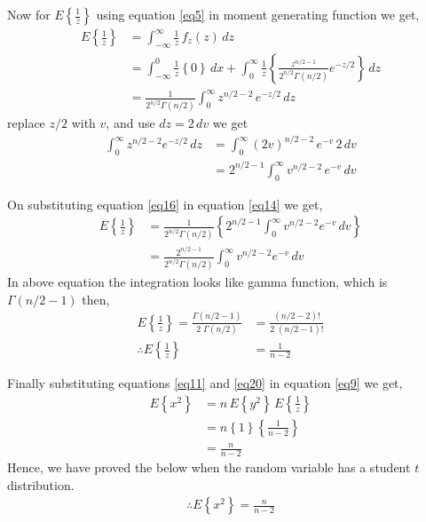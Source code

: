 \documentclass{beamer}
\providecommand{\cbrak}[1]{\ensuremath{\left\{#1\right\}}}
\begin{document}
\begin{frame}
   Now for $E\cbrak{\frac{1}{z}}$ using  equation \eqref{eq5} in moment generating function we get,
   \begin{align}
      E\cbrak{\frac{1}{z}} &= \int_{-\infty}^{\infty} \frac{1}{z} \, f_z(z) \, dz \\
      					  &= \int_{-\infty}^{0} \frac{1}{z} \cbrak{0} \, dx + \int_{0}^{\infty} \frac{1}{z} \cbrak{\frac{z^{n/2 -1}}{2^{n/2} \Gamma(n/2)}e^{- z/2}} \, dz \\
      					  &= \frac{1}{2^{n/2} \Gamma(n/2)}\int_{0}^{\infty} z^{n/2 -2} \, e^{- z/2} \, dz \label{eq14}				  
   \end{align}
   replace $z/2$ with $v$, and use $dz = 2 \, dv$ we get
   \begin{align}
      \int_{0}^{\infty} z^{n/2 -2} e^{- z/2} \, dz 
         &= \int_{0}^{\infty} {(2v)}^{n/2 -2} \, e^{- v} \,  2 \, dv \\
         &= 2^{n/2 - 1} \int_{0}^{\infty} v^{n/2 -2} \, e^{- v} \, dv \label{eq16}
   \end{align}
       
\end{frame}
 

\begin{frame}{}
   On substituting equation \eqref{eq16} in equation \eqref{eq14} we get,
   \begin{align}
      E\cbrak{\frac{1}{z}} 
           &= \frac{1}{2^{n/2} \Gamma(n/2)} \cbrak{2^{n/2 - 1} \int_{0}^{\infty} v^{n/2 -2} e^{- v} \, dv} \\
           &= \frac{2^{n/2 - 1}}{2^{n/2} \Gamma(n/2)} \int_{0}^{\infty} v^{n/2 -2} e^{- v} \, dv
   \end{align}    
   In above equation the integration looks like gamma function, which is $\Gamma(n/2-1)$ then,
   \begin{align}
       E\cbrak{\frac{1}{z}} = \frac{ \Gamma(n/2 - 1)}{2 \; \Gamma(n/2)}
        					   &= \frac{(n/2 - 2)!}{2 \; (n/2 - 1)!} \\
       			\therefore E\cbrak{\frac{1}{z}}   &= \frac{1}{n - 2} \label{eq20}
   \end{align}
    
\end{frame}


\begin{frame}{}
   Finally substituting equations \eqref{eq11} and \eqref{eq20} in equation \eqref{eq9} we get,
   \begin{align}
     E\cbrak{x^2} &= n \, E\cbrak{y^2} \, E\cbrak{\frac{1}{z}} \\
                  &= n \cbrak{1} \cbrak{\frac{1}{n - 2}} \\
                  &= \frac{n}{n - 2}
   \end{align}
   Hence, we have proved the below when the random variable has a student $t$ distribution.
   \begin{align}
      \therefore E\cbrak{x^2} = \frac{n}{n - 2}
   \end{align}
\end{frame}
\end{document}
